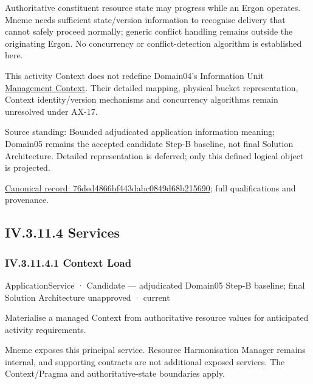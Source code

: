 Authoritative constituent resource state may progress while an Ergon operates.
Mneme needs sufficient state/version information to recognise delivery that cannot
safely proceed normally; generic conflict handling remains outside the originating
Ergon. No concurrency or conflict-detection algorithm is established here.



This activity Context does not redefine Domain04's Information Unit
\href{\detokenize{../../../../../../../../docs/markdown/04-information-architecture/metamodel/information-architecture-metamodel.md#65-context}}{Management Context}.
Their detailed mapping, physical bucket representation, Context identity/version
mechanisms and concurrency algorithms remain unresolved under AX-17.



Source standing: Bounded adjudicated application information meaning; Domain05 remains the accepted candidate Step-B baseline, not final Solution Architecture. Detailed representation is deferred; only this defined logical object is projected.


{\footnotesize \href{../../../../../../../continuum/application/data-object/76ded4866bf443dabc0849d68b215690.md}{Canonical record: 76ded4866bf443dabc0849d68b215690}; full qualifications and provenance.}\par
\subsection*{IV.3.11.4 Services}
\label{navigation:IV.3.11.4}

\subsubsection*{IV.3.11.4.1 Context Load}
\label{navigation:IV.3.11.4.1}

\label{element:1ccfe420541945bb9c0756a949799d95}
{\small ApplicationService · Candidate — adjudicated Domain05 Step-B baseline; final Solution Architecture unapproved · current}\par

Materialise a managed Context from authoritative resource values for anticipated activity requirements.



Mneme exposes this principal service. Resource Harmonisation Manager remains internal, and supporting contracts are not additional exposed services. The Context/Pragma and authoritative-state boundaries apply.


